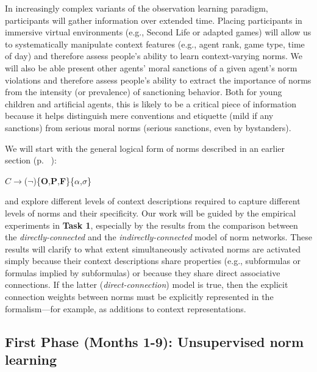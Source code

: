 \documentclass[12pt]{article}
\begin{document}
In increasingly complex variants of the observation learning paradigm,
participants will gather information over extended
time. Placing participants in immersive virtual environments
(e.g., Second Life or adapted games) will allow us to
systematically manipulate context features (e.g., agent rank, game
type, time of day) and therefore assess people's ability to learn
context-varying norms.  We will also be able present other agents'
moral sanctions of a given agent's norm violations and therefore assess
people's ability to extract the importance of norms from the intensity
(or prevalence) of sanctioning behavior.  Both for young
children and artificial agents, this is likely to be a critical piece of
information because it helps distinguish mere conventions and
etiquette (mild if any sanctions) from serious moral norms (serious
sanctions, even by bystanders).

\vskip 0.1in
\vskip 0.1in

\vskip 0.1in

\noindent We will start with the general logical form of norms described in an earlier section (p. ~\pageref{sec:core}):

\vskip 0.1in
$C \rightarrow$($\neg$)\{{\bf O},{\bf P},{\bf F}\}\{$\alpha$,$\sigma$\}
\vskip 0.1in

\noindent and explore different levels of context descriptions required
to capture different levels of norms and their specificity.  Our work
will be guided by the empirical experiments in {\bf Task 1}, especially by the
results from the comparison between the {\em directly-connected} and the {\em indirectly-connected} model of norm networks.  These results will clarify to what extent simultaneously activated norms are activated simply because their context descriptions
share properties (e.g., subformulas or formulas implied by
subformulas) or because they share direct associative connections.  If the latter ({\em direct-connection}) model is true, then the explicit connection weights between norms must be
explicitly represented in the formalism---for example, as additions to context representations.

\subsection*{First Phase (Months 1-9): Unsupervised norm learning}
\end{document}
